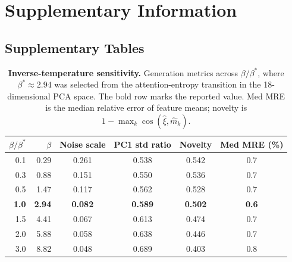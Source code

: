 
\setcounter{section}{0}
\setcounter{figure}{0}
\setcounter{table}{0}
\setcounter{equation}{0}
\renewcommand{\thesection}{S\arabic{section}}
\renewcommand{\thefigure}{\arabic{figure}}
\renewcommand{\thetable}{\arabic{table}}
\renewcommand{\theequation}{S\arabic{equation}}
\renewcommand{\figurename}{Supplementary Figure}
\renewcommand{\tablename}{Supplementary Table}

\section*{Supplementary Information}

\subsection*{Supplementary Tables}

\begin{table}[ht]
\centering
\caption{\textbf{Inverse-temperature sensitivity.} Generation metrics across
$\beta/\beta^*$, where $\beta^*\approx2.94$ was selected from the attention-entropy
transition in the 18-dimensional PCA space. The bold row marks the reported value.
Med MRE is the median relative error of feature means; novelty is
$1-\max_k\cos(\hat{\xi},\hat{m}_k)$.}
\label{stab:beta-sweep}
\begin{tabular}{rrcccc}
\toprule
$\beta/\beta^*$ & $\beta$ & Noise scale & PC1 std ratio & Novelty & Med MRE (\%) \\
\midrule
0.1 & 0.29 & 0.261 & 0.538 & 0.542 & 0.7 \\
0.3 & 0.88 & 0.151 & 0.550 & 0.536 & 0.7 \\
0.5 & 1.47 & 0.117 & 0.562 & 0.528 & 0.7 \\
\textbf{1.0} & \textbf{2.94} & \textbf{0.082} & \textbf{0.589} & \textbf{0.502} & \textbf{0.6} \\
1.5 & 4.41 & 0.067 & 0.613 & 0.474 & 0.7 \\
2.0 & 5.88 & 0.058 & 0.638 & 0.446 & 0.7 \\
3.0 & 8.82 & 0.048 & 0.689 & 0.403 & 0.8 \\
\bottomrule
\end{tabular}
\end{table}

